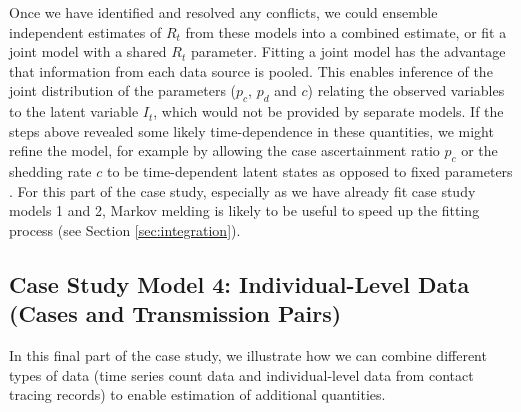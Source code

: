 \documentclass{article}
\begin{document}
\begin{enumerate}
    Once we have identified and resolved any conflicts, we could ensemble independent estimates of $R_t$ from these models into a combined estimate, or fit a joint model with a shared $R_t$ parameter. Fitting a joint model has the advantage that information from each data source is pooled. This enables inference of the joint distribution of the parameters ($p_c$, $p_d$ and $c$) relating the observed variables to the latent variable $I_t$, which would not be provided by separate models.  If the steps above revealed some likely time-dependence in these quantities, we might refine the model, for example by allowing the case ascertainment ratio $p_c$ or the shedding rate $c$ to be time-dependent latent states as opposed to fixed parameters \citep{watson2024jointly}. For this part of the case study, especially as we have already fit case study models 1 and 2, Markov melding is likely to be useful to speed up the fitting process (see Section \ref{sec:integration}).
\end{enumerate}

\subsection{Case Study Model 4: Individual-Level Data (Cases and Transmission Pairs)}

In this final part of the case study, we illustrate how we can combine different types of data (time series count data and individual-level data from contact tracing records) to enable estimation of additional quantities. 
\end{document}
